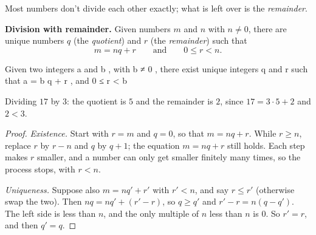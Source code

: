 Most numbers don't divide each other exactly; what is left over is the
\emph{remainder}.

\bpush\begin{btheorem}\label{thm-division}

\textbf{Division with remainder.} Given numbers \(m\) and \(n\) with
\(n \neq 0\), there are unique numbers \(q\) (the \emph{quotient}) and
\(r\) (the \emph{remainder}) such that
\[m = nq + r \qquad\text{and}\qquad 0 \le r < n.\]

\end{btheorem}\bpop

\bpush\begin{bquote}

Given two
integers a and b , with b ≠ 0 , there exist unique integers q and r such
that a = b q + r , and 0 ≤ r \textless{} \textbar{} b \textbar{}

\end{bquote}\bpop

\bpush\begin{bexample}

Dividing
\(17\) by \(3\): the quotient is \(5\) and the remainder is \(2\), since
\(17 = 3 \cdot 5 + 2\) and \(2 < 3\).

\end{bexample}\bpop

\bpush\begin{proof}

\emph{Existence.} Start with \(r = m\) and \(q = 0\), so that
\(m = nq + r\). While \(r \ge n\), replace \(r\) by \(r - n\) and \(q\)
by \(q + 1\); the equation \(m = nq + r\) still holds. Each step makes
\(r\) smaller, and a number can only get smaller finitely many times, so
the process stops, with \(r < n\).

\emph{Uniqueness.} Suppose also \(m = nq' + r'\) with \(r' < n\), and
say \(r \le r'\) (otherwise swap the two). Then \(nq = nq' + (r' - r)\),
so \(q \ge q'\) and \(r' - r = n(q - q')\). The left side is less than
\(n\), and the only multiple of \(n\) less than \(n\) is \(0\). So
\(r' = r\), and then \(q' = q\).

\end{proof}\bpop


